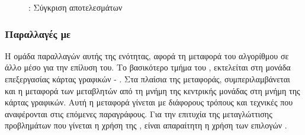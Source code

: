 \begin{figure}[htb]
{}%
\caption{: Σύγκριση αποτελεσμάτων }
\end{figure}
\subsubsection{Παραλλαγές με \emph{}}
Η ομάδα παραλλαγών αυτής της ενότητας, αφορά τη μεταφορά του αλγορίθμου σε άλλο μέσο για την επίλυση του. Το βασικότερο τμήμα του \emph{}, εκτελείται στη μονάδα επεξεργασίας κάρτας γραφικών - \emph{}. Στα πλαίσια της μεταφοράς, συμπεριλαμβάνεται και η μεταφορά των μεταβλητών από τη μνήμη της κεντρικής μονάδας στη μνήμη της κάρτας γραφικών. Αυτή η μεταφορά γίνεται με διάφορους τρόπους και τεχνικές που αναφέρονται στις επόμενες παραγράφους. Για την επιτυχία της μεταγλώττισης προβλημάτων που γίνεται η χρήση της \textbf{}, είναι απαραίτητη η χρήση των επιλογών .

\clearpage
